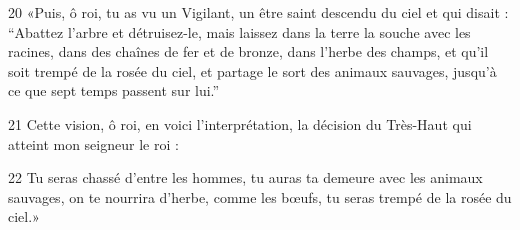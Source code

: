 
20 «Puis, ô roi, tu as vu un Vigilant, un être saint descendu du ciel et qui disait : “Abattez l’arbre et détruisez-le, mais laissez dans la terre la souche avec les racines, dans des chaînes de fer et de bronze, dans l’herbe des champs, et qu’il soit trempé de la rosée du ciel, et partage le sort des animaux sauvages, jusqu’à ce que sept temps passent sur lui.”

21 Cette vision, ô roi, en voici l’interprétation, la décision du Très-Haut qui atteint mon seigneur le roi :

22 Tu seras chassé d’entre les hommes, tu auras ta demeure avec les animaux sauvages, on te nourrira d’herbe, comme les bœufs, tu seras trempé de la rosée du ciel.»

